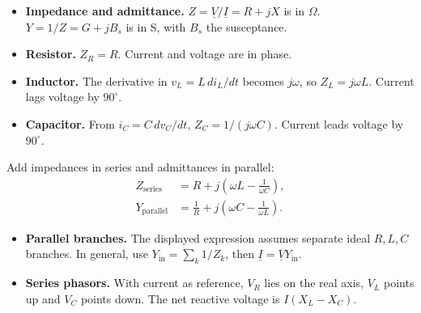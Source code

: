 \documentclass[12pt,a4paper]{article}
\begin{document}
\begin{itemize}[leftmargin=*, itemsep=3pt, topsep=4pt]
  \item \textbf{Impedance and admittance.} \(Z=\underline V/\underline I=R+jX\) is in \(\Omega\). \(Y=1/Z=G+jB_s\) is in S, with \(B_s\) the susceptance.
  \item \textbf{Resistor.} \(Z_R=R\). Current and voltage are in phase.
  \item \textbf{Inductor.} The derivative in \(v_L=L\,di_L/dt\) becomes \(j\omega\), so \(Z_L=j\omega L\). Current lags voltage by \(90^\circ\).
  \item \textbf{Capacitor.} From \(i_C=C\,dv_C/dt\), \(Z_C=1/(j\omega C)\). Current leads voltage by \(90^\circ\).
\end{itemize}

Add impedances in series and admittances in parallel:
\[
\begin{aligned}
Z_{\mathrm{series}}&=R+j\left(\omega L-\frac{1}{\omega C}\right),\\
Y_{\mathrm{parallel}}&=\frac{1}{R}
       +j\left(\omega C-\frac{1}{\omega L}\right).
\end{aligned}
\]
\begin{itemize}[leftmargin=*, itemsep=3pt, topsep=4pt]
  \item \textbf{Parallel branches.} The displayed expression assumes separate ideal \(R,L,C\) branches. In general, use \(Y_{\mathrm{in}}=\sum_k 1/Z_k\), then \(\underline I=\underline VY_{\mathrm{in}}\).
  \item \textbf{Series phasors.} With current as reference, \(V_R\) lies on the real axis, \(V_L\) points up and \(V_C\) points down. The net reactive voltage is \(I(X_L-X_C)\).
\end{itemize}

\begin{tcolorbox}[tikzbox,title={Series RLC phasors for a net inductive load},unbreakable]
\centering
{}
\end{tcolorbox}
\end{document}
